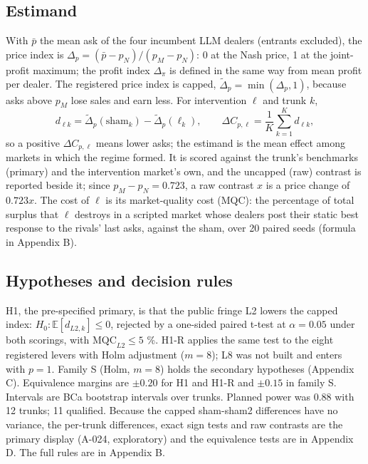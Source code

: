 \documentclass[11pt,a4paper]{article}
\begin{document}
\subsection{Estimand}
With $\bar p$ the mean ask of the four incumbent LLM dealers (entrants excluded), the price index is $\Delta_p = (\bar p - p_N)/(p_M - p_N)$: 0 at the Nash price, 1 at the joint-profit maximum; the profit index $\Delta_\pi$ is defined in the same way from mean profit per dealer. The registered price index is capped, $\tilde\Delta_p = \min(\Delta_p, 1)$, because asks above $p_M$ lose sales and earn less. For intervention $\ell$ and trunk $k$, 
\begin{equation}
d_{\ell k} = \tilde\Delta_p(\text{sham}_k) - \tilde\Delta_p(\ell_k), \qquad \Delta C_{p,\ell} = \frac{1}{K}\sum_{k=1}^{K} d_{\ell k},
\end{equation}
 so a positive $\Delta C_{p,\ell}$ means lower asks; the estimand is the mean effect among markets in which the regime formed. It is scored against the trunk's benchmarks (primary) and the intervention market's own, and the uncapped (raw) contrast is reported beside it; since $p_M - p_N = 0.723$, a raw contrast $x$ is a price change of $0.723x$. The cost of $\ell$ is its market-quality cost (MQC): the percentage of total surplus that $\ell$ destroys in a scripted market whose dealers post their static best response to the rivals' last asks, against the sham, over 20 paired seeds (formula in Appendix B).

\subsection{Hypotheses and decision rules}
H1, the pre-specified primary, is that the public fringe L2 lowers the capped index: $H_0: \mathbb E[d_{L2,k}] \le 0$, rejected by a one-sided paired t-test at $\alpha = 0.05$ under both scorings, with $\mathrm{MQC}_{L2} \le 5$ \%. H1-R applies the same test to the eight registered levers with Holm adjustment ($m = 8$); L8 was not built and enters with $p = 1$. Family S (Holm, $m = 8$) holds the secondary hypotheses (Appendix C). Equivalence margins are $\pm 0.20$ for H1 and H1-R and $\pm 0.15$ in family S. Intervals are BCa bootstrap intervals over trunks. Planned power was 0.88 with 12 trunks; 11 qualified. Because the capped sham-sham2 differences have no variance, the per-trunk differences, exact sign tests and raw contrasts are the primary display (A-024, exploratory) and the equivalence tests are in Appendix D. The full rules are in Appendix B.
\end{document}
